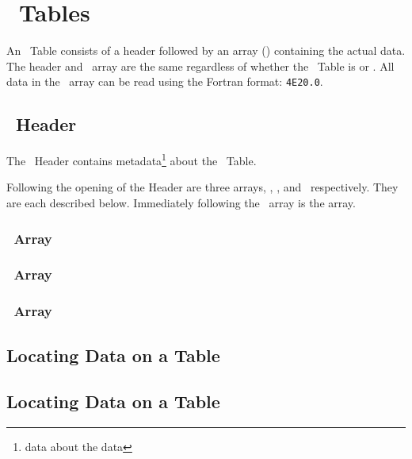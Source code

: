 \section{\ACE\ Tables}
An \ACE\ Table consists of a header followed by an array (\XSS) containing the actual data. The header and \XSS\ array are the same regardless of whether the \ACE\ Table is  or . All data in the \XSS\ array can be read using the Fortran format: \texttt{4E20.0}.

\subsection{\ACE\ Header}
The \ACE\ Header contains metadata\footnote{data about the data} about the \ACE\ Table.

Following the opening of the Header are three arrays, \IZAW, \NXS, and \JXS\ respectively. They are each described below. Immediately following the \JXS\ array is the \XSS array.
\subsubsection{\IZAW\ Array}\label{sec:IZAW}
\subsubsection{\NXS\ Array}\label{sec:NXS}
\subsubsection{\JXS\ Array}\label{sec:JXS}

\subsection{Locating Data on a  Table}\label{sec:LocatingType1}
\subsection{Locating Data on a  Table}\label{sec:LocatingType2}
